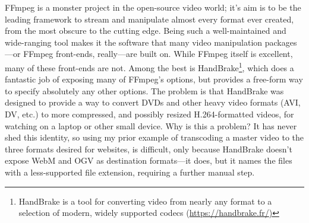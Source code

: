 \documentclass{article}
\begin{document}
FFmpeg is a monster project in the open-source video world; it's aim is to be
the leading framework to stream and manipulate almost every format ever created,
from the most obscure to the cutting edge. Being such a well-maintained and
wide-ranging tool makes it the software that many video manipulation
packages---or FFmpeg front-ends, really---are built on. While FFmpeg itself is
excellent, many of these front-ends are not. Among the best is HandBrake\footnote{HandBrake is a tool for converting video from nearly any format to a
selection of modern, widely supported codecs (\href{https://handbrake.fr/}{\url{https://handbrake.fr/})}},
which does a fantastic job of exposing many of FFmpeg's options, but provides a
free-form way to specify absolutely any other options. The problem is that
HandBrake was designed to provide a way to convert DVDs and other heavy video
formats (AVI, DV, etc.) to more compressed, and possibly resized H.264-formatted
videos, for watching on a laptop or other small device. Why is this a problem?
It has never shed this identity, so using my prior example of transcoding a
master video to the three formats desired for websites, is difficult, only
because HandBrake doesn't expose WebM and OGV as destination formats---it does,
but it names the files with a less-supported file extension, requiring a further
manual step.
\end{document}
